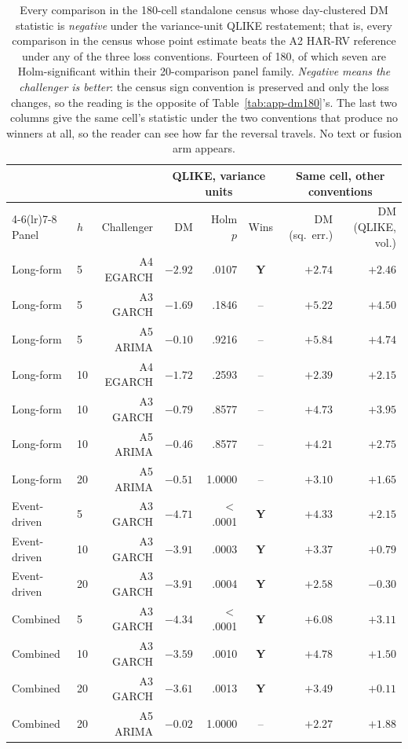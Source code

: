 \begin{table}[htbp]
\centering
\caption[The fourteen favourable variance-unit comparisons]{Every
comparison in the 180-cell standalone census whose day-clustered DM
statistic is \emph{negative} under the variance-unit QLIKE restatement;
that is, every comparison in the census whose point estimate beats the
A2 HAR-RV reference under any of the three loss conventions.
Fourteen of 180, of which seven are Holm-significant within their
20-comparison panel family. \emph{Negative means the challenger is better}:
the census sign convention is preserved and only the loss changes, so the
reading is the opposite of Table~\ref{tab:app-dm180}'s. The last two
columns give the same cell's statistic under the two conventions that
produce no winners at all, so the reader can see how far the reversal
travels. No text or fusion arm appears.}
\label{tab:app-varwinners}
\singlespacing\small
\setlength{\tabcolsep}{4pt}
\begin{tabular}{@{}llrrrcrr@{}}
\toprule
& & & \multicolumn{3}{c}{QLIKE, variance units} & \multicolumn{2}{c}{Same cell, other conventions} \\
\cmidrule(lr){4-6}\cmidrule(lr){7-8}
Panel & $h$ & Challenger & DM & Holm $p$ & Wins & DM (sq.\ err.) & DM (QLIKE, vol.) \\
\midrule
Long-form & 5 & A4 EGARCH & $-2.92$ & .0107 & \textbf{Y} & $+2.74$ & $+2.46$ \\
Long-form & 5 & A3 GARCH & $-1.69$ & .1846 & -- & $+5.22$ & $+4.50$ \\
Long-form & 5 & A5 ARIMA & $-0.10$ & .9216 & -- & $+5.84$ & $+4.74$ \\
Long-form & 10 & A4 EGARCH & $-1.72$ & .2593 & -- & $+2.39$ & $+2.15$ \\
Long-form & 10 & A3 GARCH & $-0.79$ & .8577 & -- & $+4.73$ & $+3.95$ \\
Long-form & 10 & A5 ARIMA & $-0.46$ & .8577 & -- & $+4.21$ & $+2.75$ \\
Long-form & 20 & A5 ARIMA & $-0.51$ & 1.0000 & -- & $+3.10$ & $+1.65$ \\
Event-driven & 5 & A3 GARCH & $-4.71$ & $<$.0001 & \textbf{Y} & $+4.33$ & $+2.15$ \\
Event-driven & 10 & A3 GARCH & $-3.91$ & .0003 & \textbf{Y} & $+3.37$ & $+0.79$ \\
Event-driven & 20 & A3 GARCH & $-3.91$ & .0004 & \textbf{Y} & $+2.58$ & $-0.30$ \\
Combined & 5 & A3 GARCH & $-4.34$ & $<$.0001 & \textbf{Y} & $+6.08$ & $+3.11$ \\
Combined & 10 & A3 GARCH & $-3.59$ & .0010 & \textbf{Y} & $+4.78$ & $+1.50$ \\
Combined & 20 & A3 GARCH & $-3.61$ & .0013 & \textbf{Y} & $+3.49$ & $+0.11$ \\
Combined & 20 & A5 ARIMA & $-0.02$ & 1.0000 & -- & $+2.27$ & $+1.88$ \\
\bottomrule
\end{tabular}
\end{table}

